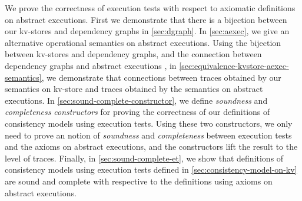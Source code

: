 We prove the correctness of execution tests with respect to axiomatic definitions on abstract executions.
First we demonstrate that there is a bijection between our kv-stores and dependency graphs in \cref{sec:dgraph}.
In \cref{sec:aexec}, we give an alternative operational semantics on abstract executions.
Using the bijection between kv-stores and dependency graphs, 
and the connection between dependency graphs and abstract executions \citep{laws,SIanalysis}, 
in \cref{sec:equivalence-kvstore-aexec-semantics}, we demonstrate that connections between 
traces obtained by our semantics on kv-store and traces obtained by the semantics on abstract executions.
In \cref{sec:sound-complete-constructor},
we define \emph{soundness} and \emph{completeness constructors} for proving the correctness of our definitions
of consistency models using execution tests.
Using these two constructors, 
we only need to prove an notion of \emph{soundness} and \emph{completeness}
between execution tests and the axioms on abstract executions,
and the constructors lift the result to the level of traces.
Finally, in \cref{sec:sound-complete-et},
we show that definitions of consistency models using execution tests defined in \cref{sec:consistency-model-on-kv} 
are sound and complete with respective to the definitions using axioms on abstract executions.
